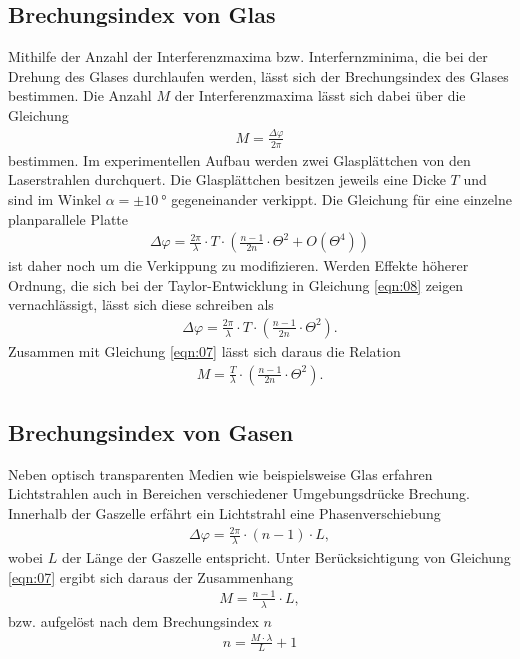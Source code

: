 \subsection{Brechungsindex von Glas}
\noindent Mithilfe der Anzahl der Interferenzmaxima bzw. Interfernzminima, die
bei der Drehung des Glases durchlaufen werden, lässt sich der Brechungsindex des
Glases bestimmen. Die Anzahl $M$ der Interferenzmaxima lässt sich dabei über die
Gleichung
\begin{align}
  M = \frac{\Delta \varphi}{2 \pi}
  \label{eqn:07}
\end{align}
\noindent bestimmen. Im experimentellen Aufbau werden zwei Glasplättchen von den
Laserstrahlen durchquert. Die Glasplättchen besitzen jeweils eine Dicke $T$ und
sind im Winkel $\alpha = \pm \SI{10}{\degree}$ gegeneinander verkippt. Die
Gleichung für eine einzelne planparallele Platte
\begin{align}
  \Delta \varphi = \frac{2 \pi}{\lambda} \cdot T \cdot \left(\frac{n-1}{2n} \cdot \Theta^2 + O(\Theta^4)  \right)
  \label{eqn:08}
\end{align}
\noindent ist daher noch um die Verkippung zu modifizieren. Werden
Effekte höherer Ordnung, die sich bei der Taylor-Entwicklung in Gleichung
\ref{eqn:08} zeigen vernachlässigt, lässt sich diese schreiben als
\begin{align}
  \Delta \varphi = \frac{2 \pi}{\lambda} \cdot T \cdot \left(\frac{n-1}{2n} \cdot \Theta^2  \right).
  \label{eqn:09}
\end{align}
\noindent Zusammen mit Gleichung \ref{eqn:07} lässt sich daraus die Relation
\begin{align}
  M = \frac{T}{\lambda} \cdot \left( \frac{n-1}{2n} \cdot \Theta^2  \right).
  \label{eqn:10}
\end{align}
\subsection{Brechungsindex von Gasen}
\noindent Neben optisch transparenten Medien wie beispielsweise Glas erfahren
Lichtstrahlen auch in Bereichen verschiedener Umgebungsdrücke Brechung.
Innerhalb der Gaszelle erfährt ein Lichtstrahl eine Phasenverschiebung
\begin{align}
  \Delta \varphi = \frac{2 \pi}{\lambda} \cdot (n - 1) \cdot L,
  \label{eqn:11}
\end{align}
\noindent wobei $L$ der Länge der Gaszelle entspricht. Unter Berücksichtigung
von Gleichung \ref{eqn:07} ergibt sich daraus der Zusammenhang
\begin{align}
  M = \frac{n-1}{\lambda} \cdot L,
  \label{eqn:12}
\end{align}
\noindent bzw. aufgelöst nach dem Brechungsindex $n$
\begin{align}
  n = \frac{M \cdot \lambda}{L} + 1
  \label{eqn:13}
\end{align}

